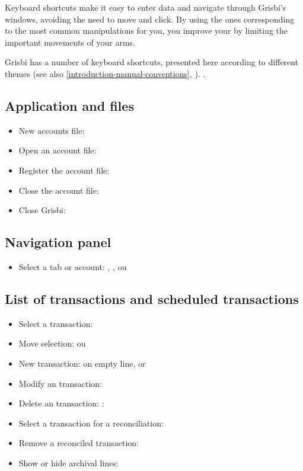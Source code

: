 Keyboard shortcuts make it easy to enter data and navigate through Grisbi's windows, avoiding the need to move and click. By using the ones corresponding to the most common manipulations for you, you improve your  by limiting the important movements of your arms.
 
Grisbi has a number of keyboard shortcuts, presented here according to different themes (see also  \vref{introduction-manual-conventions}, ).
.

\subsection{Application and files}

\begin{itemize}
	\item New accounts file: 
	\item Open an account file: 
	\item Register the account file: 
	\item Close the account file: 
	\item Close Grisbi: 
\end{itemize}


\subsection{Navigation panel}

\begin{itemize}
	\item Select a tab or account: , ,  ou 
\end{itemize}

\subsection{List of transactions and scheduled transactions}

\begin{itemize}
	\item Select a transaction: 
	\item Move selection: ou 
	\item New transaction:   on empty line, or 
	\item Modify an transaction: 
	\item Delete an transaction: :
	\item Select a transaction for a reconciliation:
	\item Remove a reconciled transaction: 
	\item Show or hide archival lines: 
\end{itemize}


